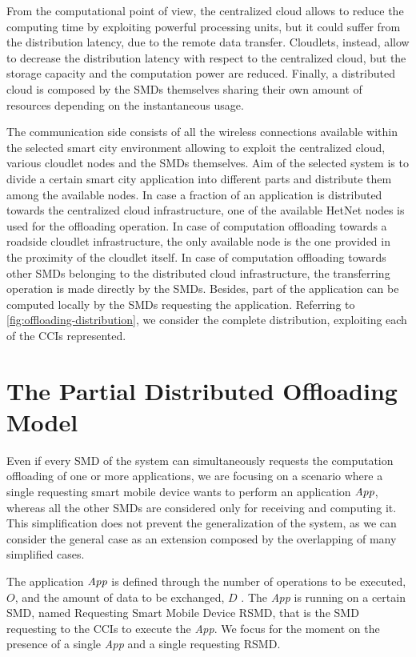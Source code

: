 \documentclass[twoside,openright]{report}
\begin{document}
From the computational point of view, the centralized cloud allows to reduce the computing time by exploiting powerful processing units, but it could suffer from the distribution latency, due to the remote data transfer. Cloudlets, instead, allow to decrease the distribution latency with respect to the centralized cloud, but the storage capacity and the computation power are reduced. Finally, a distributed cloud is composed by the \glspl{SMD} themselves sharing their own amount of resources depending on the instantaneous usage.

The communication side consists of all the wireless connections available within the selected smart city environment allowing to exploit the centralized cloud, various cloudlet nodes and the \glspl{SMD} themselves. 
Aim of the selected system is to divide a certain smart city application into different parts and distribute them among the available nodes. 
In case a  fraction  of an application is distributed towards the centralized cloud infrastructure, one of the available \gls{HetNet} nodes is used for the offloading operation. 
In case of computation offloading towards a roadside cloudlet infrastructure, the only available node is the one provided in the proximity of the cloudlet itself. 
In case of computation offloading towards other \glspl{SMD} belonging to the distributed cloud infrastructure, the transferring operation is made directly by the \glspl{SMD}. 
Besides, part of the application can be computed locally by the   \glspl{SMD}  requesting the application.  Referring to \autoref{fig:offloading-distribution}, we consider the complete distribution, exploiting each of the \glspl{CCI} represented.

\section{The Partial Distributed Offloading Model}
\label{sec:system-model}
Even if every \gls{SMD} of the system can simultaneously requests the computation offloading of one or more applications, we are focusing on a scenario where a single requesting smart mobile device wants to perform an application $\emph{App}$, whereas all the other \glspl{SMD} are considered only for receiving and computing it. 
This simplification does not prevent the generalization of the system, as we can consider the general case as an extension composed by the overlapping of many simplified cases. 

The application $\emph{App}$ is defined through the number of operations to be executed, $O$, and the amount of data to be exchanged, $D$%
. The \emph{App} is running on a certain \gls{SMD}, named Requesting Smart Mobile Device \gls{RSMD}, that is the \gls{SMD} requesting to the \glspl{CCI} to execute the \emph{App}. We focus for the moment on the presence of a single \emph{App} and a single requesting \gls{RSMD}. 
\end{document}

